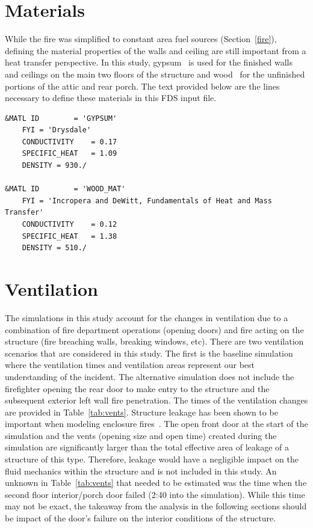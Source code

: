 \documentclass[11pt,oneside]{book}
\begin{document}
\section{Materials}
\label{matl}
While the fire was simplified to constant area fuel sources (Section~\ref{fire}), defining the material properties of the walls and ceiling are still important from a heat transfer perspective. In this study, gypsum~\cite{Drysdale:1} is used for the finished walls and ceilings on the main two floors of the structure and wood~\cite{Incropera:1} for the unfinished portions of the attic and rear porch. The text provided below are the lines necessary to define these materials in this FDS input file.

\begin{lstlisting}
&MATL ID        = 'GYPSUM'
    FYI = 'Drysdale' 
    CONDUCTIVITY    = 0.17
    SPECIFIC_HEAT   = 1.09
    DENSITY = 930./

&MATL ID        = 'WOOD_MAT'
    FYI = 'Incropera and DeWitt, Fundamentals of Heat and Mass Transfer'
    CONDUCTIVITY    = 0.12
    SPECIFIC_HEAT   = 1.38
    DENSITY = 510./ 
\end{lstlisting}

\section{Ventilation}
\label{Vents}
The simulations in this study account for the changes in ventilation due to a combination of fire department operations (opening doors) and fire acting on the structure (fire breaching walls, breaking windows, etc). There are two ventilation scenarios that are considered in this study. The first is the baseline simulation where the ventilation times and ventilation areas represent our best understanding of the incident. The alternative simulation does not include the firefighter opening the rear door to make entry to the structure and the subsequent exterior left wall fire penetration. The times of the ventilation changes are provided in Table~\ref{tab:vents}. Structure leakage has been shown to be important when modeling enclosure fires~\cite{beal2009}. The open front door at the start of the simulation and the vents (opening size and open time) created during the simulation are significantly larger than the total effective area of leakage of a structure of this type. Therefore, leakage would have a negligible impact on the fluid mechanics within the structure and is not included in this study. An unknown in Table~\ref{tab:vents} that needed to be estimated was the time when the second floor interior/porch door failed (2:40 into the simulation). While this time may not be exact, the takeaway from the analysis in the following sections should be impact of the door's failure on the interior conditions of the structure.
\end{document}

